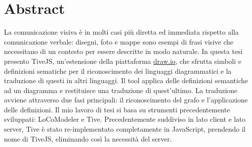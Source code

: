 \chapter*{Abstract}

    La comunicazione visiva è in molti casi più diretta ed immediata rispetto alla comunicazione verbale: disegni, foto e mappe sono esempi di frasi visive che necessitano di un contesto per essere descritte in modo naturale.
    \newline
    In questa tesi presento TiveJS, un'estensione della piattaforma \href{https://www.draw.io/}{draw.io}, che sfrutta  simboli e  definizioni sematiche per il riconoscimento dei linguaggi diagrammatici e la traduzione di questi in altri linguaggi.
    Il tool applica  delle definizioni semantiche  ad un diagramma e restituisce una traduzione di quest'ultimo. La traduzione avviene attraverso due fasi principali: il riconoscimento del grafo e l'applicazione delle definizioni.
    \newline
    Il mio lavoro di tesi si basa su strumenti precedentemente sviluppati: LoCoModeler e Tive. Precedentemente suddiviso in lato client e lato server, Tive è stato re-implementato completamente in JavaScript, prendendo il nome di TiveJS, eliminando così la necessità del server.
